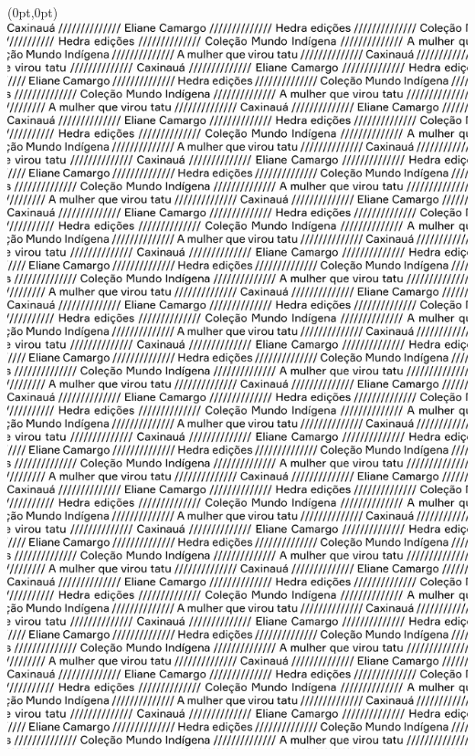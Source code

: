\thispagestyle{empty}
\begin{textblock*}{2.625in}(0pt,0pt)%
\vspace*{-2.4cm}
\hspace*{-2.3cm}\includegraphics[width=138mm]{./MI_CAMARGO_TATU_ABERTURA.png}  
\end{textblock*}
\clearpage

\thispagestyle{empty}





